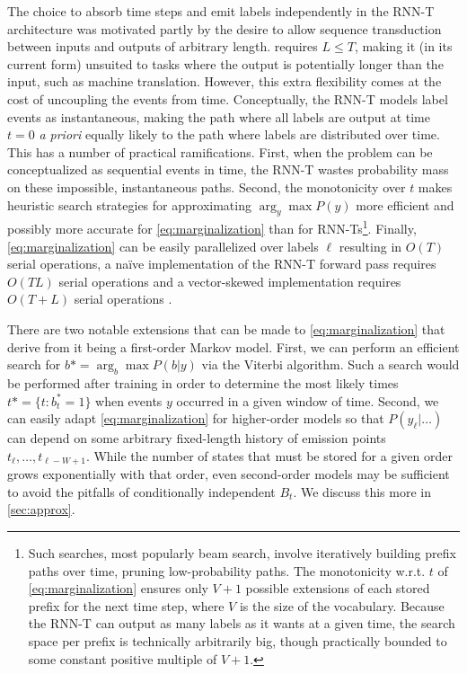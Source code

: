 \documentclass{article}
\begin{document}
The choice to absorb time steps and emit labels independently in the RNN-T
architecture was motivated partly by the desire to allow sequence transduction
between inputs and outputs of arbitrary length. 
requires $L \leq T$, making it (in its current form) unsuited to tasks where
the output is potentially longer than the input, such as machine translation.
However, this extra flexibility comes at the cost of uncoupling the events from
time. Conceptually, the RNN-T models label events as instantaneous, making the
path where all labels are output at time $t=0$ \textit{a priori} equally likely
to the path where labels are distributed over time. This has a number of
practical ramifications. First, when the problem can be conceptualized as
sequential events in time, the RNN-T wastes probability mass on these
impossible, instantaneous paths. Second, the monotonicity over $t$ makes
heuristic search strategies for approximating $\arg_y \max P(y)$ more efficient
and possibly more accurate for \cref{eq:marginalization} than for
RNN-Ts\footnote{
%
    Such searches, most popularly beam search, involve iteratively building
    prefix paths over time, pruning low-probability paths. The monotonicity
    w.r.t. $t$ of \cref{eq:marginalization} ensures only $V + 1$ possible
    extensions of each stored prefix for the next time step, where $V$ is the
    size of the vocabulary. Because the RNN-T can output as many labels as it
    wants at a given time, the search space per prefix is technically
    arbitrarily big, though practically bounded to some constant positive
    multiple of $V + 1$.
%
}. Finally, \cref{eq:marginalization} can be easily parallelized over labels
$\ell$ resulting in $O(T)$ serial operations, a na\"{i}ve implementation of the
RNN-T forward pass requires $O(TL)$ serial operations and a vector-skewed
implementation requires $O(T + L)$ serial operations
\cite{bagbyEfficientImplementationRecurrent18}.


There are two notable extensions that can be made to \cref{eq:marginalization}
that derive from it being a first-order Markov model. First, we can perform an
efficient search for $b* = \arg_b \max P(b|y)$ via the Viterbi algorithm. Such
a search would be performed after training in order to determine the most
likely times $t* = \{t: b^*_t = 1\}$ when events $y$ occurred in a given window
of time. Second, we can easily adapt \cref{eq:marginalization} for higher-order
models so that $P(y_\ell|\ldots)$ can depend on some arbitrary fixed-length
history of emission points $t_\ell,\ldots,t_{\ell - W + 1}$. While the number
of states that must be stored for a given order grows exponentially with that
order, even second-order models may be sufficient to avoid the pitfalls of
conditionally independent $B_t$. We discuss this more in \cref{sec:approx}.
\end{document}

